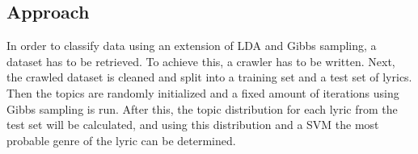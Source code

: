 \subsection{Approach}
In order to classify data using an extension of LDA and Gibbs sampling, a dataset has to be retrieved. To achieve this, a crawler has to be written. Next, the crawled dataset is cleaned and split into a training set and a test set of lyrics. Then the topics are randomly initialized and a fixed amount of iterations using Gibbs sampling is run. After this, the topic distribution for each lyric from the test set will be calculated, and using this distribution and a SVM the most probable genre of the lyric can be determined.